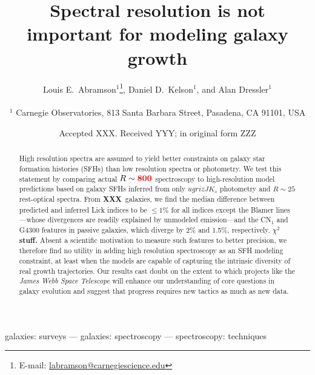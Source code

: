 \documentclass[a4paper,fleqn,usenatbib]{mnras}
\title[Who needs spectra?]{Spectral resolution is not important for modeling galaxy growth}
\author[Abramson, Kelson, \& Dressler]{Louis E.~Abramson$^{1}$\thanks{E-mail: \href{mailto:labramson@carnegiescience.edu}{labramson@carnegiescience.edu}},
Daniel D.~Kelson$^{1}$,
and Alan Dressler$^{1}$
\\
\\
$^1$	Carnegie Observatories, 813 Santa Barbara Street, Pasadena, CA 91101, USA\\
}
\date{Accepted XXX. Received YYY; in original form ZZZ}
\newcommand{\resp}{respectively}
\newcommand{\bfr}{\bf\color{red}}
\newcommand{\ntot}{{\bfr XXX}} %
\begin{document}
\label{firstpage}
\pagerange{\pageref{firstpage}--\pageref{lastpage}}
\maketitle

\begin{abstract}

	High resolution spectra are assumed to yield better constraints on galaxy star formation
	histories (SFHs) than low resolution spectra or photometry. We test this statement 
	by comparing actual $R\sim{\bfr 800}$ spectroscopy to high-resolution model predictions 
	based on galaxy SFHs inferred from only $ugrizJK_{s}$ photometry and $R\sim25$ 
	rest-optical spectra. From \ntot\ galaxies, we find the median difference between predicted 
	and inferred Lick indices to be $\leq1\%$ for all indices except the Blamer lines---whose 
	divergences are readily explained by unmodeled emission---and the CN$_{1}$ and G4300 
	features in passive galaxies, which diverge by 2\% and 1.5\%, \resp. {\bfr $\chi^{2}$ stuff.} 
	Absent a scientific motivation to measure such features to better precision, we therefore
	find no utility in adding high resolution spectroscopy as an SFH modeling constraint, at least 
	when the models are capable of capturing the intrinsic diversity of real growth trajectories. 
	Our results cast doubt on the extent to which projects like the {\it James Webb Space Telescope}
	will enhance our understanding of core questions in galaxy evolution and suggest that progress 
	requires new tactics as much as new data.

\end{abstract}

\begin{keywords}
	galaxies: surveys --- galaxies: spectroscopy --- spectroscopy: techniques
\end{keywords}


\end{document}
